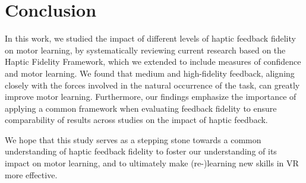 \section{Conclusion}

In this work, we studied the impact of different levels of haptic feedback fidelity on motor learning, by systematically reviewing current research based on the Haptic Fidelity Framework, which we extended to include measures of confidence and motor learning. 
We found that medium and high-fidelity feedback, aligning closely with the forces involved in the natural occurrence of the task, can greatly improve motor learning. 
Furthermore, our findings emphasize the importance of applying a common framework when evaluating feedback fidelity to ensure comparability of results across studies on the impact of haptic feedback.

We hope that this study serves as a stepping stone towards a common understanding of haptic feedback fidelity to foster our understanding of its impact on motor learning, and to ultimately make (re-)learning new skills in VR more effective. 